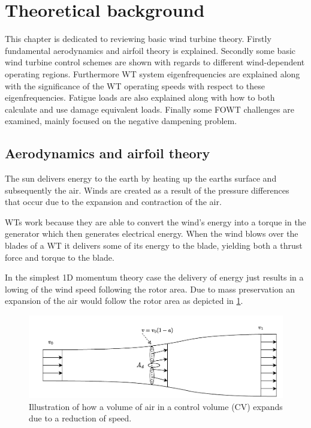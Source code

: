 \section{Theoretical background} \label{sec:theory}
This chapter is dedicated to reviewing basic wind turbine theory. Firstly fundamental aerodynamics and airfoil theory is explained. Secondly some basic wind turbine control schemes are shown with regards to different wind-dependent operating regions. Furthermore WT system eigenfrequencies are explained along with the significance of the WT operating speeds with respect to these eigenfrequencies. Fatigue loads are also explained along with how to both calculate and use damage equivalent loads. Finally some FOWT challenges are examined, mainly focused on the negative dampening problem.

\subsection{Aerodynamics and airfoil theory} \label{sec:theory_aero}
The sun delivers energy to the earth by heating up the earths surface and subsequently the air. Winds are created as a result of the pressure differences that occur due to the expansion and contraction of the air. 

WTs work because they are able to convert the wind's energy into a torque in the generator which then generates electrical energy. When the wind blows over the blades of a WT it delivers some of its energy to the blade, yielding both a thrust force and torque to the blade.

In the simplest 1D momentum theory case the delivery of energy just results in a lowing of the wind speed following the rotor area. Due to mass preservation an expansion of the air would follow the rotor area as depicted in \cref{fig:betz}.
\begin{figure}[ht]
	\centering
	\includegraphics[width=0.8\linewidth]{Graphics/FlowThroughRotor.pdf}
	\caption{Illustration of how a volume of air in a control volume (CV) expands due to a reduction of speed.}
	\label{fig:betz}
\end{figure}

